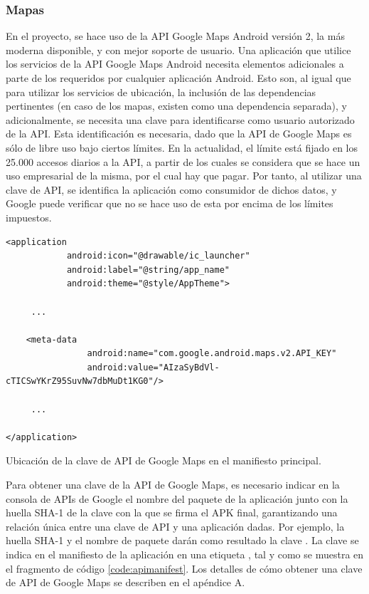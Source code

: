 \subsubsection{Mapas}
    En el proyecto, se hace uso de la API Google Maps Android versión 2, la más moderna disponible, y con mejor soporte de usuario. Una aplicación que utilice los servicios de la API Google Maps Android necesita elementos adicionales a parte de los requeridos por cualquier aplicación Android. Esto son, al igual que para utilizar los servicios de ubicación, la inclusión de las dependencias pertinentes (en caso de los mapas, existen como una dependencia separada), y adicionalmente, se necesita una clave para identificarse como usuario autorizado de la \ac{API}. Esta identificación es necesaria, dado que la API de Google Maps es sólo de libre uso bajo ciertos límites. En la actualidad, el límite está fijado en los 25.000 accesos diarios a la API, a partir de los cuales se considera que se hace un uso empresarial de la misma, por el cual hay que pagar. Por tanto, al utilizar una clave de API, se identifica la aplicación como consumidor de dichos datos, y Google puede verificar que no se hace uso de esta por encima de los límites impuestos.
        
\begin{listing}[h] 
\begin{verbatim}
<application
            android:icon="@drawable/ic_launcher"
            android:label="@string/app_name"
            android:theme="@style/AppTheme">

     ...
        
    <meta-data
                android:name="com.google.android.maps.v2.API_KEY"
                android:value="AIzaSyBdVl-cTICSwYKrZ95SuvNw7dbMuDt1KG0"/>
    
     ...    
    
</application>
\end{verbatim}
\caption{Ubicación de la clave de API de Google Maps en el manifiesto principal.}
\label{code:apimanifest}
\end{listing}

    Para obtener una clave de la API de Google Maps, es necesario indicar  en la consola de APIs de Google el nombre del paquete de la aplicación junto con la huella SHA-1 de la clave con la que se firma el APK final, garantizando una relación única entre una clave de API y una aplicación dadas. Por ejemplo, la huella SHA-1  y el nombre de paquete  darán como resultado la clave . La clave se indica en el manifiesto de la aplicación en una etiqueta , tal y como se muestra en el fragmento de código \ref{code:apimanifest}. Los detalles de cómo obtener una clave de API de Google Maps se describen en el apéndice A.
    
